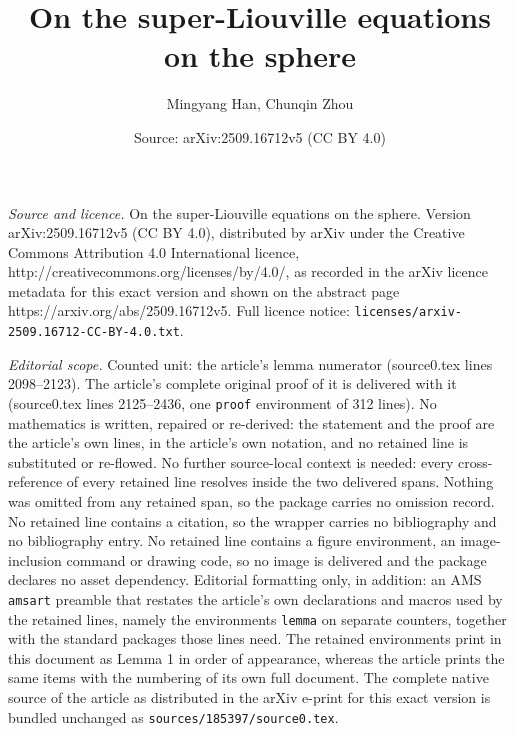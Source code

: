 \documentclass[10pt,a4paper]{amsart}
\title{On the super-Liouville equations on the sphere}
\author{Mingyang Han, Chunqin Zhou}
\date{Source: arXiv:2509.16712v5 (CC BY 4.0)}
\begin{document}
\maketitle

\noindent\emph{Source and licence.} On the super-Liouville equations on the sphere. Version arXiv:2509.16712v5 (CC BY 4.0), distributed by arXiv under the Creative Commons Attribution 4.0 International licence, http://creativecommons.org/licenses/by/4.0/, as recorded in the arXiv licence metadata for this exact version and shown on the abstract page https://arxiv.org/abs/2509.16712v5. Full licence notice: \texttt{licenses/arxiv-2509.16712-CC-BY-4.0.txt}.\par\smallskip

\noindent\textit{Editorial scope.} Counted unit: the article's lemma numerator (source0.tex lines 2098--2123). The article's complete original proof of it is delivered with it (source0.tex lines 2125--2436, one \texttt{proof} environment of 312 lines). No mathematics is written, repaired or re-derived: the statement and the proof are the article's own lines, in the article's own notation, and no retained line is substituted or re-flowed.  No further source-local context is needed: every cross-reference of every retained line resolves inside the two delivered spans.  Nothing was omitted from any retained span, so the package carries no omission record.  No retained line contains a citation, so the wrapper carries no bibliography and no bibliography entry.  No retained line contains a figure environment, an image-inclusion command or drawing code, so no image is delivered and the package declares no asset dependency.  Editorial formatting only, in addition: an AMS \texttt{amsart} preamble that restates the article's own declarations and macros used by the retained lines, namely the environments \texttt{lemma} on separate counters, together with the standard packages those lines need.  The retained environments print in this document as Lemma 1 in order of appearance, whereas the article prints the same items with the numbering of its own full document.  The complete native source of the article as distributed in the arXiv e-print for this exact version is bundled unchanged as \texttt{sources/185397/source0.tex}.
\end{document}
